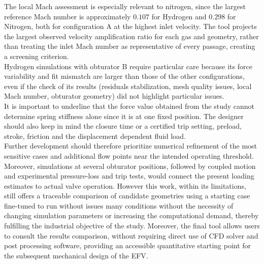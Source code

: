 The local Mach assessment is especially relevant to nitrogen, since the largest reference Mach number is approximately $0.107$ for Hydrogen and $0.298$ for Nitrogen, both for configuration A at the highest inlet velocity. The tool projects the largest observed velocity amplification ratio for each gas and geometry, rather than treating the inlet Mach number as representative of every passage, creating a screening criterion.\\

Hydrogen simulations with obturator B require particular care because its force variability and fit mismatch are larger than those of the other configurations, even if the check of its results (residuals stabilization, mesh quality issues, local Mach number, obturator geometry) did not highlight particular issues.\\

It is important to underline that the force value obtained from the study cannot determine spring stiffness alone since it is at one fixed position. The designer should also keep in mind the closure time or a certified trip setting, preload, stroke, friction and the displacement dependent fluid load.\\

Further development should therefore prioritize numerical refinement of the most sensitive cases and additional flow points near the intended operating threshold. Moreover, simulations at several obturator positions, followed by coupled motion and experimental pressure-loss and trip tests, would connect the present loading estimates to actual valve operation. However this work, within its limitations, still offers a traceable comparison of candidate geometries using a starting case fine-tuned to run without issues many conditions without the necessity of changing simulation parameters or increasing the computational demand, thereby fulfilling the industrial objective of the study. Moreover, the final tool allows users to consult the results comparison, without requiring direct use of CFD solver and post processing software,  providing an accessible quantitative starting point for the subsequent mechanical design of the EFV.